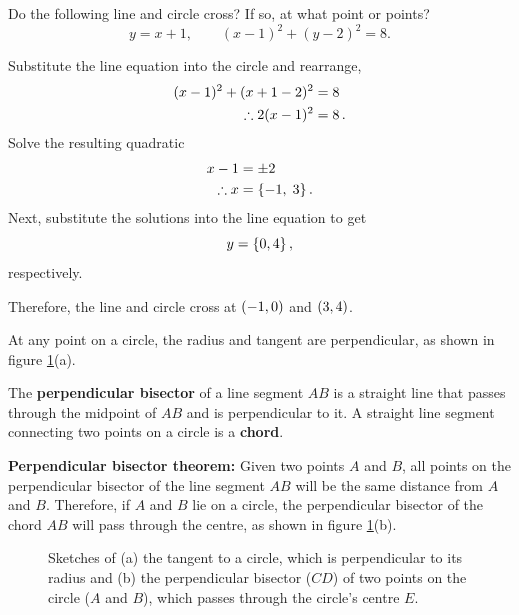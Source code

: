 \goodbreak
\begin{example}[Lecture]
Do the following line and circle cross? If so, at what point or points?
\[
y=x+1, \qquad (x-1)^2+(y-2)^2=8.
\]
\end{example}
%
\begin{solution}
Substitute the line equation into the circle and rearrange, 
\begin{align*}
    (x-1)^2 + (x+1-2)^2 &= 8 \\
    \therefore 2(x-1)^2 &= 8 \, .
\end{align*}
Solve the resulting quadratic
\begin{align*}
    x-1 &= \pm 2\\
    \therefore x &= \{-1,\; 3\} \, .
\end{align*}
Next, substitute the solutions into the line equation to get
\[
    y = \{0,4\} \, ,
\]
respectively. \par
Therefore, the line and circle cross at $(-1,0)$ and $(3,4)$.
\end{solution}

At any point on a circle, the radius and tangent are perpendicular, as shown in figure \ref{fig:perp_rad}(a). 

\begin{definition}
    The \textbf{perpendicular bisector} of a line segment $AB$ is a straight line that passes through the midpoint of $AB$ and is perpendicular to it.
    A straight line segment connecting two points on a circle is a \textbf{chord}.
\end{definition}

\textbf{Perpendicular bisector theorem:} Given two points $A$ and $B$, all points on the perpendicular bisector of the line segment $AB$ will be the same distance from $A$ and $B$. Therefore, if $A$ and $B$ lie on a circle, the perpendicular bisector of the chord $AB$ will pass through the centre, as shown in figure \ref{fig:perp_rad}(b). 

\begin{figure}[ht]
    \centering
    \hfill
    \caption{Sketches of (a) the tangent to a circle, which is perpendicular to its radius and (b) the perpendicular bisector ($CD$) of two points on the circle ($A$ and $B$), which passes through the circle's centre $E$.}
    \label{fig:perp_rad}
\end{figure}

